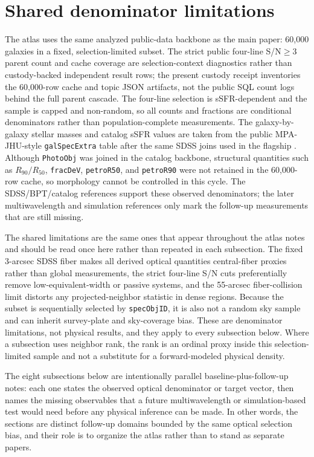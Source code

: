 \documentclass[twocolumn]{aastex631}
\begin{document}
\section{Shared denominator limitations}
The atlas uses the same analyzed public-data backbone as the main paper: 60,000 galaxies in a fixed, selection-limited subset. The strict public four-line S/N$\geq3$ parent count and cache coverage are selection-context diagnostics rather than custody-backed independent result rows; the present custody receipt inventories the 60,000-row cache and topic JSON artifacts, not the public SQL count logs behind the full parent cascade. The four-line selection is sSFR-dependent and the sample is capped and non-random, so all counts and fractions are conditional denominators rather than population-complete measurements. The galaxy-by-galaxy stellar masses and catalog sSFR values are taken from the public MPA-JHU-style \texttt{galSpecExtra} table after the same SDSS joins used in the flagship \citep{sdssdr17,brinchmann2004,york2000}. Although \texttt{PhotoObj} was joined in the catalog backbone, structural quantities such as \(R_{90}/R_{50}\), \texttt{fracDeV}, \texttt{petroR50}, and \texttt{petroR90} were not retained in the 60,000-row cache, so morphology cannot be controlled in this cycle. The SDSS/BPT/catalog references support these observed denominators; the later multiwavelength and simulation references only mark the follow-up measurements that are still missing.

The shared limitations are the same ones that appear throughout the atlas notes and should be read once here rather than repeated in each subsection. The fixed 3-arcsec SDSS fiber makes all derived optical quantities central-fiber proxies rather than global measurements, the strict four-line S/N cuts preferentially remove low-equivalent-width or passive systems, and the 55-arcsec fiber-collision limit distorts any projected-neighbor statistic in dense regions. Because the subset is sequentially selected by \texttt{specObjID}, it is also not a random sky sample and can inherit survey-plate and sky-coverage bias. These are denominator limitations, not physical results, and they apply to every subsection below. Where a subsection uses neighbor rank, the rank is an ordinal proxy inside this selection-limited sample and not a substitute for a forward-modeled physical density.

The eight subsections below are intentionally parallel baseline-plus-follow-up notes: each one states the observed optical denominator or target vector, then names the missing observables that a future multiwavelength or simulation-based test would need before any physical inference can be made. In other words, the sections are distinct follow-up domains bounded by the same optical selection bias, and their role is to organize the atlas rather than to stand as separate papers.
\end{document}
